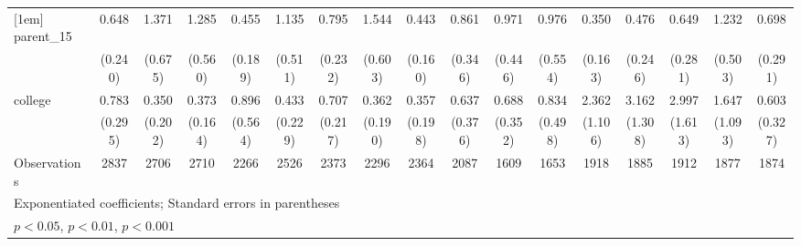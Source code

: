 {\begin{tabular}{l*{16}{c}}
[1em]
parent\_15           &       0.648         &       1.371         &       1.285         &       0.455         &       1.135         &       0.795         &       1.544         &       0.443\sym{*}  &       0.861         &       0.971         &       0.976         &       0.350\sym{*}  &       0.476         &       0.649         &       1.232         &       0.698         \\
                    &     (0.240)         &     (0.675)         &     (0.560)         &     (0.189)         &     (0.511)         &     (0.232)         &     (0.603)         &     (0.160)         &     (0.346)         &     (0.446)         &     (0.554)         &     (0.163)         &     (0.246)         &     (0.281)         &     (0.503)         &     (0.291)         \\
[1em]
college             &       0.783         &       0.350         &       0.373\sym{*}  &       0.896         &       0.433         &       0.707         &       0.362         &       0.357         &       0.637         &       0.688         &       0.834         &       2.362         &       3.162\sym{**} &       2.997\sym{*}  &       1.647         &       0.603         \\
                    &     (0.295)         &     (0.202)         &     (0.164)         &     (0.564)         &     (0.229)         &     (0.217)         &     (0.190)         &     (0.198)         &     (0.376)         &     (0.352)         &     (0.498)         &     (1.106)         &     (1.308)         &     (1.613)         &     (1.093)         &     (0.327)         \\
\hline
Observations        &        2837         &        2706         &        2710         &        2266         &        2526         &        2373         &        2296         &        2364         &        2087         &        1609         &        1653         &        1918         &        1885         &        1912         &        1877         &        1874         \\
\hline\hline
\multicolumn{17}{l}{\footnotesize Exponentiated coefficients; Standard errors in parentheses}\\
\multicolumn{17}{l}{\footnotesize \sym{*} \(p<0.05\), \sym{**} \(p<0.01\), \sym{***} \(p<0.001\)}\\
\end{tabular}
}
